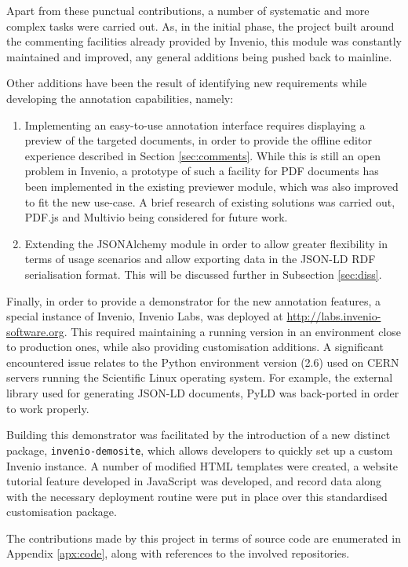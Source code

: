 Apart from these punctual contributions, a number of systematic and more
complex tasks were carried out. As, in the initial phase, the project built
around the commenting facilities already provided by Invenio, this module was
constantly maintained and improved, any general additions being pushed
back to mainline.

Other additions have been the result of identifying new requirements while
developing the annotation capabilities, namely:
\begin{enumerate}
  \item Implementing an easy-to-use annotation interface requires displaying a
        preview of the targeted documents, in order to provide the offline
        editor experience described in Section \ref{sec:comments}. While this
        is still an open problem in Invenio, a prototype of such a facility for
        PDF documents has been implemented in the existing previewer module,
        which was also improved to fit the new use-case. A brief research of
        existing solutions was carried out, PDF.js \cite{ref:pdfjs} and Multivio
        \cite{ref:multivio} being considered for future work.
  \item Extending the JSONAlchemy module in order to allow greater
        flexibility in terms of usage scenarios and allow exporting data in
        the JSON-LD RDF serialisation format. This will be discussed further in
        Subsection \ref{sec:diss}.
\end{enumerate}

Finally, in order to provide a demonstrator for the new annotation features, a
special instance of Invenio, Invenio Labs, was deployed at
\url{http://labs.invenio-software.org}. This required maintaining a running
version in an environment close to production ones, while also providing
customisation additions. A significant encountered issue relates to the Python
environment version (2.6) used on CERN servers running the Scientific Linux
operating system. For example, the external library used for generating JSON-LD
documents, PyLD \cite{ref:pyld} was back-ported in order to work properly.

Building this demonstrator was facilitated by the introduction of a new
distinct package, \texttt{invenio-demosite}, which allows developers to quickly
set up a custom Invenio instance. A number of modified HTML templates were
created, a website tutorial feature developed in JavaScript was developed, and
record data along with the necessary deployment routine were put in
place over this standardised customisation package.

The contributions made by this project in terms of source code are
enumerated in Appendix \ref{apx:code}, along with references to the involved
repositories.
